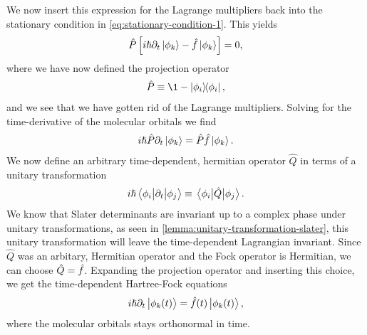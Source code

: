    We now insert this expression for the Lagrange multipliers back into the
    stationary condition in \autoref{eq:stationary-condition-1}.
    This yields
    \begin{align}
        \hat{P}\left[ 
            i\hslash\partial_t\ket{\phi_k}
            - \hat{f}\ket{\phi_k}
         \right]
        = 0,
    \end{align}
    where we have now defined the projection operator
    \begin{align}
        \hat{P} \equiv \1 - \dyad{\phi_i}{\phi_i},
    \end{align}
    and we see that we have gotten rid of the Lagrange multipliers.
    Solving for the time-derivative of the molecular orbitals we find
    \begin{align}
        i\hslash\hat{P}\partial_t\ket{\phi_k}
        = \hat{P}\hat{f}\ket{\phi_k}.
    \end{align}
    We now define an arbitrary time-dependent, hermitian operator $\hat{Q}$
    in terms of a unitary transformation \cite{hochstuhl2014time}
    \begin{align}
        i\hslash\mel{\phi_i}{\partial_t}{\phi_j}
        \equiv
        \mel{\phi_i}{\hat{Q}}{\phi_j}.
    \end{align}
    We know that  Slater determinants are invariant up to a complex phase under
    unitary transformations, as seen in
    \autoref{lemma:unitary-transformation-slater}, this unitary transformation
    will leave the time-dependent Lagrangian invariant.
    Since $\hat{Q}$ was an arbitary, Hermitian operator and the Fock operator is
    Hermitian, we can choose $\hat{Q} = \hat{f}$.
    Expanding the projection operator and inserting this choice, we get the
    time-dependent Hartree-Fock equations
    \begin{align}
        i\hslash\partial_t\ket{\phi_k(t)}
        = \hat{f}(t)\ket{\phi_k(t)},
        \label{eq:tdhf}
    \end{align}
    where the molecular orbitals stays orthonormal in time.
